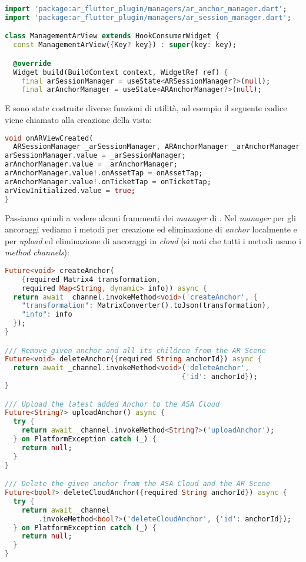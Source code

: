 \begin{lstlisting}[language=dart, label={lst:mobilesyn_managers}, firstnumber=1,caption={mobilesyn \textit{managers}}]
import 'package:ar_flutter_plugin/managers/ar_anchor_manager.dart';
import 'package:ar_flutter_plugin/managers/ar_session_manager.dart';

class ManagementArView extends HookConsumerWidget {
  const ManagementArView({Key? key}) : super(key: key);

  @override
  Widget build(BuildContext context, WidgetRef ref) {
    final arSessionManager = useState<ARSessionManager?>(null);
    final arAnchorManager = useState<ARAnchorManager?>(null);
\end{lstlisting} 

E sono state costruite diverse funzioni di utilità, ad esempio il seguente codice viene chiamato alla creazione della vista:

\begin{lstlisting}[language=dart, label={lst:mobilesyn_onARViewCreated}, firstnumber=1,caption={mobilesyn \textit{on ar view created}}]
void onARViewCreated(
  ARSessionManager _arSessionManager, ARAnchorManager _arAnchorManager) {
arSessionManager.value = _arSessionManager;
arAnchorManager.value = _arAnchorManager;
arAnchorManager.value!.onAssetTap = onAssetTap;
arAnchorManager.value!.onTicketTap = onTicketTap;
arViewInitialized.value = true;
}
\end{lstlisting} 

Passiamo quindi a vedere alcuni frammenti dei \textit{manager} di \aplug{}.
Nel \textit{manager} per gli ancoraggi vediamo i metodi per creazione ed eliminazione di \textit{anchor} localmente e per \textit{upload} ed eliminazione di ancoraggi in \textit{cloud} (si noti che tutti i metodi usano i \textit{method channels}): 

\begin{lstlisting}[language=dart, label={lst:arplug_manager}, firstnumber=1,caption={\aplug{} \textit{create, delete, ulpoad, delete cloud anchor} tramite \textit{method channel}}]
Future<void> createAnchor(
    {required Matrix4 transformation,
    required Map<String, dynamic> info}) async {
  return await _channel.invokeMethod<void>('createAnchor', {
    "transformation": MatrixConverter().toJson(transformation),
    "info": info
  });
}

/// Remove given anchor and all its children from the AR Scene
Future<void> deleteAnchor({required String anchorId}) async {
  return await _channel.invokeMethod<void>('deleteAnchor',
                                          {'id': anchorId});
}

/// Upload the latest added Anchor to the ASA Cloud
Future<String?> uploadAnchor() async {
  try {
    return await _channel.invokeMethod<String?>('uploadAnchor');
  } on PlatformException catch (_) {
    return null;
  }
}

/// Delete the given anchor from the ASA Cloud and the AR Scene
Future<bool?> deleteCloudAnchor({required String anchorId}) async {
  try {
    return await _channel
        .invokeMethod<bool?>('deleteCloudAnchor', {'id': anchorId});
  } on PlatformException catch (_) {
    return null;
  }
}
\end{lstlisting} 


